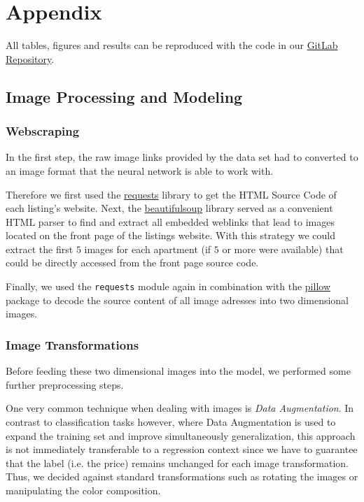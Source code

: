 \newpage
\appendix
\section{Appendix}

All tables, figures and results can be reproduced with the code in our \href{https://gitlab.gwdg.de/joel.beck/airbnb-oslo}{GitLab Repository}.

\subsection{Image Processing and Modeling} \label{appendix:images}

\subsubsection{Webscraping}

In the first step, the raw image links provided by the data set had to converted to an image format that the neural network is able to work with.

Therefore we first used the \href{https://docs.python-requests.org/en/latest/}{requests} library to get the HTML Source Code of each listing's website.
Next, the \href{https://beautiful-soup-4.readthedocs.io/en/latest/}{beautifulsoup} library served as a convenient HTML parser to find and extract all embedded weblinks that lead to images located on the front page of the listings website.
With this strategy we could extract the first $5$ images for each apartment (if $5$ or more were available) that could be directly accessed from the front page source code.

Finally, we used the \texttt{requests} module again in combination with the \href{https://pillow.readthedocs.io/en/stable/}{pillow} package to decode the source content of all image adresses into two dimensional images.

\subsubsection{Image Transformations}

Before feeding these two dimensional images into the model, we performed some further preprocessing steps.

One very common technique when dealing with images is \emph{Data Augmentation}.
In contrast to classification tasks however, where Data Augmentation is used to expand the training set and improve simultaneously generalization, this approach is not immediately transferable to a regression context since we have to guarantee that the label (i.e. the price) remains unchanged for each image transformation.
Thus, we decided against standard transformations such as rotating the images or manipulating the color composition.


